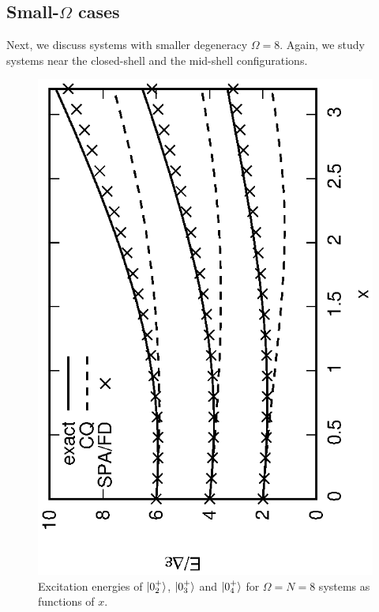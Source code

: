 \documentclass[11pt]{book} %
\begin{document}
\subsection{Small-$\Omega$ cases}
\label{SmallOmg}

Next, we discuss systems with smaller degeneracy $\Omega=8$.
Again, we study systems near the closed-shell and the mid-shell configurations.

\begin{figure}[t]
 \begin{center}
  \includegraphics[height=0.6\textwidth,angle=-90]{images/N8ex_energy_wo_adiabatic.eps}
 \end{center}
 \caption{Excitation energies of $\ket{0_2^+}$, $\ket{0_3^+}$ and
$\ket{0_4^+}$ for $\Omega=N=8$ systems as functions of $x$.
}
 \label{fig:N8energy}
\end{figure}
\end{document}
